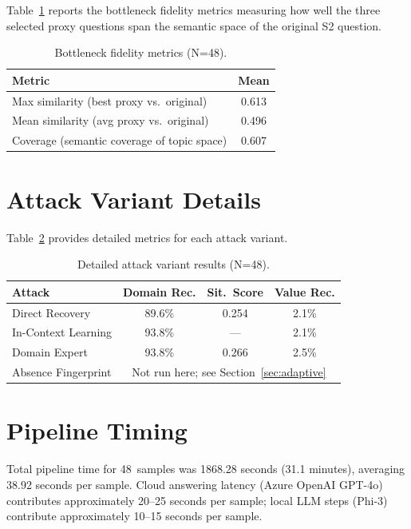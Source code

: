 \documentclass[sigconf,balance=false]{acmart}
\begin{document}
Table~\ref{tab:fidelity} reports the bottleneck fidelity metrics measuring how well the three selected proxy questions span the semantic space of the original S2 question.

\begin{table}[h]
\caption{Bottleneck fidelity metrics (N=48).}
\label{tab:fidelity}
\begin{tabular}{lc}
\toprule
\textbf{Metric} & \textbf{Mean} \\
\midrule
Max similarity (best proxy vs.\ original) & 0.613 \\
Mean similarity (avg proxy vs.\ original) & 0.496 \\
Coverage (semantic coverage of topic space) & 0.607 \\
\bottomrule
\end{tabular}
\end{table}

\section{Attack Variant Details}
\label{app:attacks}

Table~\ref{tab:attack-detail} provides detailed metrics for each attack variant.

\begin{table}[h]
\caption{Detailed attack variant results (N=48).}
\label{tab:attack-detail}
\small
\begin{tabular}{@{}lccc@{}}
\toprule
\textbf{Attack} & \textbf{Domain Rec.} & \textbf{Sit.\ Score} & \textbf{Value Rec.} \\
\midrule
Direct Recovery & 89.6\% & 0.254 & 2.1\% \\
In-Context Learning & 93.8\% & --- & 2.1\% \\
Domain Expert & 93.8\% & 0.266 & 2.5\% \\
Absence Fingerprint & \multicolumn{3}{c}{Not run here; see Section~\ref{sec:adaptive}} \\
\bottomrule
\end{tabular}
\end{table}

\section{Pipeline Timing}
\label{app:timing}

Total pipeline time for 48~samples was 1868.28 seconds (31.1 minutes), averaging 38.92 seconds per sample. Cloud answering latency (Azure OpenAI GPT-4o) contributes approximately 20--25 seconds per sample; local LLM steps (Phi-3) contribute approximately 10--15 seconds per sample.
\end{document}
